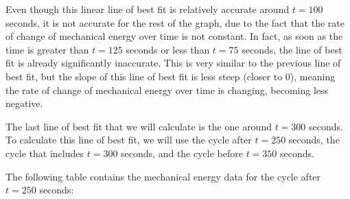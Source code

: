\documentclass[titlepage]{article}
\begin{document}
            Even though this linear line of best fit is relatively accurate around $t=100$ seconds, it is not accurate for the rest of the graph, due to the fact that the rate of change of mechanical energy over time is not constant.
            In fact, as soon as the time is greater than $t=125$ seconds or less than $t=75$ seconds, the line of best fit is already significantly inaccurate.
            This is very similar to the previous line of best fit, but the slope of this line of best fit is less steep (closer to 0), meaning the rate of change of mechanical energy over time is changing, becoming less negative.
            
            The last line of best fit that we will calculate is the one around $t=300$ seconds. To calculate this line of best fit, we will use the cycle after $t=250$ seconds, the cycle that includes $t=300$ seconds, and the cycle before $t=350$ seconds.
            
            The following table contains the mechanical energy data for the cycle after $t=250$ seconds:
            
\end{document}
